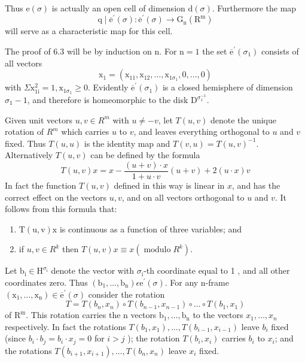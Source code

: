 \documentclass[10pt]{article}
\begin{document}
Thus $\mathrm{e}(\sigma)$ is actually an open cell of dimension $\mathrm{d}(\sigma)$. Furthermore the map
$$
\mathrm{q} \mid \overline{\mathrm{e}}^{\prime}(\sigma): \overline{\mathrm{e}}^{\prime}(\sigma) \rightarrow \mathrm{G}_{\mathrm{n}}\left(\mathrm{R}^{\mathrm{m}}\right)
$$
will serve as a characteristic map for this cell.

The proof of $6.3$ will be by induction on $\mathrm{n}$. For $\mathrm{n}=1$ the set $\overline{\mathrm{e}}^{\prime}\left(\sigma_{1}\right)$ consists of all vectors
$$
\mathrm{x}_{1}=\left(\mathrm{x}_{11}, \mathrm{x}_{12}, \ldots, \mathrm{x}_{1 \sigma_{1}}, 0, \ldots, 0\right)
$$
with $\Sigma \mathrm{x}_{1 \mathrm{i}}^{2}=1, \mathrm{x}_{1 \sigma_{1}} \geq 0$. Evidently $\overline{\mathrm{e}}^{\prime}\left(\sigma_{1}\right)$ is a closed hemisphere of dimension $\sigma_{1}-1$, and therefore is homeomorphic to the disk $\mathrm{D}^{\sigma_{1}^{-1}}$.

Given unit vectors $u, v \in R^{m}$ with $u \neq-v$, let $T(u, v)$ denote the unique rotation of $R^{m}$ which carries $u$ to $v$, and leaves everything orthogonal to $u$ and $v$ fixed. Thus $T(u, u)$ is the identity map and $T(v, u)=T(u, v)^{-1}$. Alternatively $T(u, v)$ can be defined by the formula
$$
T(u, v) x=x-\frac{(u+v) \cdot x}{1+u \cdot v}(u+v)+2(u \cdot x) v
$$
In fact the function $T(u, v)$ defined in this way is linear in $x$, and has the correct effect on the vectors $u, v$, and on all vectors orthogonal to $u$ and $v$. It follows from this formula that:

\begin{enumerate}
  \item $\mathrm{T}(\mathrm{u}, \mathrm{v}) \mathrm{x}$ is continuous as a function of three variables; and

  \item if $u, v \in R^{k}$ then $T(u, v) x \equiv x\left(\operatorname{modulo} R^{k}\right)$.

\end{enumerate}
Let $\mathrm{b}_{\mathrm{i}} \in \mathrm{H}^{\sigma_{\mathrm{i}}}$ denote the vector with $\sigma_{\mathrm{i}}$-th coordinate equal to 1 , and all other coordinates zero. Thus $\left(\mathrm{b}_{1}, \ldots, \mathrm{b}_{\mathrm{n}}\right) \epsilon \mathrm{e}^{\prime}(\sigma)$. For any $\mathrm{n}$-frame $\left(\mathrm{x}_{1}, \ldots, \mathrm{x}_{\mathrm{n}}\right) \in \overline{\mathrm{e}}^{\prime}(\sigma)$ consider the rotation
$$
T=T\left(b_{n}, x_{n}\right) \circ T\left(b_{n-1}, x_{n-1}\right) \circ \ldots \circ T\left(b_{1}, x_{1}\right)
$$
of $\mathrm{R}^{\mathrm{m}}$. This rotation carries the $\mathrm{n}$ vectors $\mathrm{b}_{1}, \ldots, \mathrm{b}_{\mathrm{n}}$ to the vectors $x_{1}, \ldots, x_{n}$ respectively. In fact the rotations $T\left(b_{1}, x_{1}\right), \ldots, T\left(b_{i-1}, x_{i-1}\right)$ leave $b_{i}$ fixed (since $b_{i} \cdot b_{j}=b_{i} \cdot x_{j}=0$ for $i>j$ ); the rotation $T\left(b_{i}, x_{i}\right)$ carries $b_{i}$ to $x_{i}$; and the rotations $T\left(b_{i+1}, x_{i+1}\right), \ldots, T\left(b_{n}, x_{n}\right)$ leave $x_{i}$ fixed.
\end{document}
